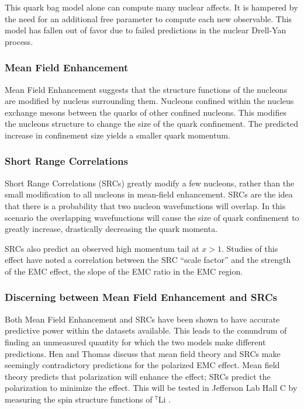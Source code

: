 This quark bag model alone can compute many nuclear affects. It is hampered by the need for an additional free parameter to compute each new observable. This model has fallen out of favor due to failed predictions in the nuclear Drell-Yan process. \cite{HenSRC}

\subsubsection{Mean Field Enhancement}

Mean Field Enhancement suggests that the structure functions of the nucleons are modified by nucleus surrounding them. Nucleons confined within the nucleus exchange mesons between the quarks of other confined nucleons. This modifies the nucleons structure to change the size of the quark confinement. The predicted increase in confinement size yields a smaller quark momentum. \cite{HenSRC,Daniel_thesis}

\subsubsection{Short Range Correlations}

Short Range Correlations (SRCs) greatly modify a few nucleons, rather than the small modification to all nucleons in mean-field enhancement. SRCs are the idea that there is a probability that two nucleon wavefunctions will overlap. In this scenario the overlapping wavefunctions will cause the size of quark confinement to greatly increase, drastically decreasing the quark momenta.

SRCs also predict an observed high momentum tail at $x>1$. Studies of this effect have noted a correlation between the SRC ``scale factor'' and the strength of the EMC effect, the slope of the EMC ratio in the EMC region. \cite{HenSRC,CLASSRC,WeinsteinSRC}

\subsubsection{Discerning between Mean Field Enhancement and SRCs}

Both Mean Field Enhancement and SRCs have been shown to have accurate predictive power within the datasets available. This leads to the conundrum of finding an unmeasured quantity for which the two models make different predictions. Hen \cite{HenSRC} and Thomas \cite{ThomasSRC} discuss that mean field theory and SRCs make seemingly contradictory predictions for the polarized EMC effect. Mean field theory predicts that polarization will enhance the effect; SRCs predict the polarization to minimize the effect. This will be tested in Jefferson Lab Hall C by measuring the spin structure functions of $^7$Li \cite{CLASspinEMC}.